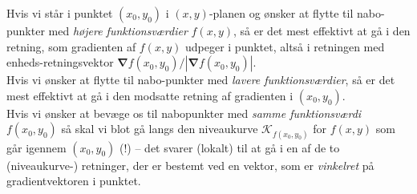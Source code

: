 \begin{aha}
Hvis vi står i  punktet $(x_{0}, y_{0})$ i $(x,y)$-planen og ønsker at flytte til nabo-punkter med \emph{højere funktionsværdier} $f(x,y)$, så er det  mest effektivt at gå i den retning, som gradienten af $f(x,y)$ udpeger i punktet, altså i retningen med enheds-retningsvektor ${\bm{\nabla}}f(x_{0}, y_{0})/|{\bm{\nabla}}f(x_{0}, y_{0})|$. \\

Hvis vi ønsker at flytte til nabo-punkter med \emph{lavere funktionsværdier}, så er det mest effektivt at gå i den modsatte retning af gradienten i $(x_{0}, y_{0})$. \\

Hvis vi ønsker at bevæge os til nabopunkter med \emph{samme funktionsværdi} $f(x_{0}, y_{0})$ så skal vi blot gå langs den niveaukurve $\mathcal{K}_{f(x_{0}, y_{0})}$ for $f(x,y)$ som går igennem $(x_{0}, y_{0})$ (!) -- det svarer (lokalt) til at gå i en af de to (niveaukurve-) retninger, der er bestemt ved en vektor, som er \emph{vinkelret} på gradientvektoren i punktet.
\end{aha}

